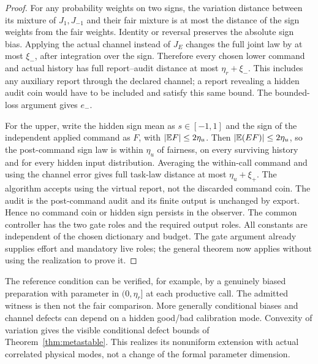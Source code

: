 \begin{proof}
For any probability weights on two signs, the variation distance between its mixture of $J_1,J_{-1}$ and their fair mixture is at most the distance of the sign weights from the fair weights. Identity or reversal preserves the absolute sign bias. Applying the actual channel instead of $J_E$ changes the full joint law by at most $\xi_-$, after integration over the sign. Therefore every chosen lower command and actual history has full report--audit distance at most $\eta_r+\xi_-$. This includes any auxiliary report through the declared channel; a report revealing a hidden audit coin would have to be included and satisfy this same bound. The bounded-loss argument gives $e_-$.

For the upper, write the hidden sign mean as $s\in[-1,1]$ and the sign of the independent applied command as $F$, with $|\mathbb E F|\le2\eta_u$. Then $|\mathbb E(EF)|\le2\eta_u$, so the post-command sign law is within $\eta_u$ of fairness, on every surviving history and for every hidden input distribution. Averaging the within-call command and using the channel error gives full task-law distance at most $\eta_u+\xi_+$. The algorithm accepts using the virtual report, not the discarded command coin. The audit is the post-command audit and its finite output is unchanged by export. Hence no command coin or hidden sign persists in the observer. The common controller has the two gate roles and the required output roles. All constants are independent of the chosen dictionary and budget. The gate argument already supplies effort and mandatory live roles; the general theorem now applies without using the realization to prove it.
\end{proof}

The reference condition can be verified, for example, by a genuinely biased preparation with parameter in $(0,\eta_r]$ at each productive call. The admitted witness is then not the fair comparison. More generally conditional biases and channel defects can depend on a hidden good/bad calibration mode. Convexity of variation gives the visible conditional defect bounds of Theorem~\ref{thm:metastable}. This realizes its nonuniform extension with actual correlated physical modes, not a change of the formal parameter dimension.

